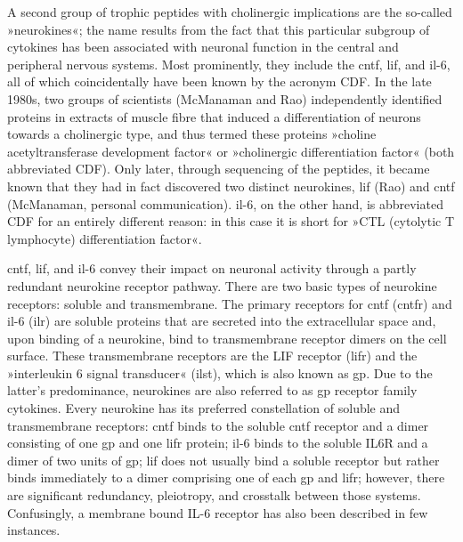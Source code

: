 A second group of trophic peptides with cholinergic implications are the so-called »neurokines«; the name results from the fact that this particular subgroup of cytokines has been associated with neuronal function in the central and peripheral nervous systems. Most prominently, they include the \ac{cntf}, \ac{lif}, and \ac{il}-6, all of which coincidentally have been known by the acronym CDF. In the late 1980s, two groups of scientists (McManaman\cite{McManaman1988} and Rao\cite{Rao1992}) independently identified proteins in extracts of muscle fibre that induced a differentiation of neurons towards a cholinergic type, and thus termed these proteins »choline acetyltransferase development factor« or »cholinergic differentiation factor« (both abbreviated CDF). Only later, through sequencing of the peptides, it became known that they had in fact discovered two distinct neurokines, \ac{lif} (Rao) and \ac{cntf} (McManaman, personal communication). \ac{il}-6, on the other hand, is abbreviated CDF for an entirely different reason: in this case it is short for »CTL (cytolytic T lymphocyte) differentiation factor«.

\ac{cntf}, \ac{lif}, and \ac{il}-6 convey their impact on neuronal activity through a partly redundant neurokine receptor pathway.\cite{Berger2014} There are two basic types of neurokine receptors: soluble and transmembrane. The primary receptors for \ac{cntf} (\acs{cntfr}) and \ac{il}-6 (\acs{ilr}) are soluble proteins that are secreted into the extracellular space and, upon binding of a neurokine, bind to transmembrane receptor dimers on the cell surface. These transmembrane receptors are the LIF receptor (\acs{lifr}) and the »interleukin 6 signal transducer« (\acs{ilst}), which is also known as \acs{gp}. Due to the latter's predominance, neurokines are also referred to as \ac{gp} receptor family cytokines\cite{White2011}. Every neurokine has its preferred constellation of soluble and transmembrane receptors: \ac{cntf} binds to the soluble \ac{cntf} receptor and a dimer consisting of one \ac{gp} and one \ac{lifr} protein; \ac{il}-6 binds to the soluble IL6R and a dimer of two units of \ac{gp}; \ac{lif} does not usually bind a soluble receptor but rather binds immediately to a dimer comprising one of each \ac{gp} and \ac{lifr}; however, there are significant redundancy, pleiotropy, and crosstalk between those systems.\cite{Rawlings2004, White2011, Nathanson2012} Confusingly, a membrane bound IL-6 receptor has also been described in few instances.\cite{}

